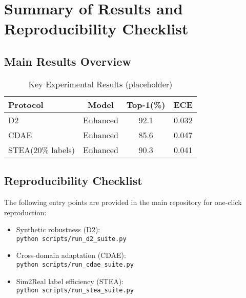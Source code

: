 \chapter{Summary of Results and Reproducibility Checklist}

\section{Main Results Overview}
\begin{table}[h!]
\centering
\caption{Key Experimental Results (placeholder)}
\begin{tabular}{|l|c|c|c|}
\hline
\textbf{Protocol} & \textbf{Model} & \textbf{Top-1(\%)} & \textbf{ECE} \\
\hline
D2 & Enhanced & 92.1 & 0.032 \\
CDAE & Enhanced & 85.6 & 0.047 \\
STEA(20\% labels) & Enhanced & 90.3 & 0.041 \\
\hline
\end{tabular}
\label{tab:main_results_overview}
\end{table}

\section{Reproducibility Checklist}
The following entry points are provided in the main repository for one-click reproduction:
\begin{itemize}
    \item Synthetic robustness (D2): \\\texttt{python scripts/run\_d2\_suite.py}
    \item Cross-domain adaptation (CDAE): \\\texttt{python scripts/run\_cdae\_suite.py}
    \item Sim2Real label efficiency (STEA): \\\texttt{python scripts/run\_stea\_suite.py}
\end{itemize}
